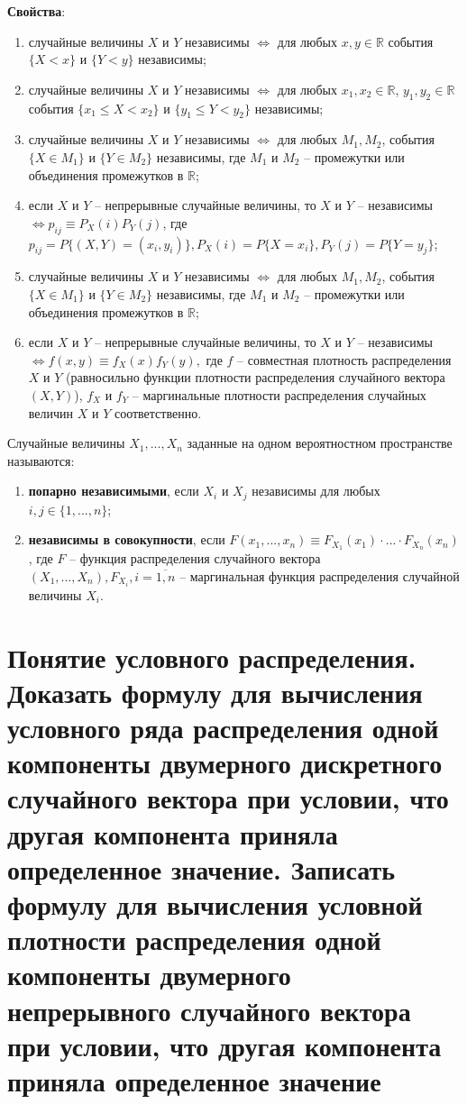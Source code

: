 \textbf{Свойства}:
\begin{enumerate}
	\item случайные величины $X$ и $Y$ независимы $\iff$ для любых $x, y \in \mathbb{R}$ события $\{X < x\}$ и $\{Y < y\}$ независимы;
	\item случайные величины $X$ и $Y$ независимы $\iff$ для любых $x_1, x_2 \in \mathbb{R}$, $y_1, y_2 \in \mathbb{R}$ события $\{x_1 \leq X < x_2\}$ и $\{y_1 \leq Y < y_2\}$ независимы;
	\item случайные величины $X$ и $Y$ независимы $\iff$ для любых $M_1, M_2$, события $\{X \in M_1\}$ и $\{Y \in M_2\}$ независимы, где $M_1$ и $M_2$ -- промежутки или объединения промежутков в $\mathbb{R}$;
	\item если $X$ и $Y$ -- непрерывные случайные величины, то $X$ и $Y$ -- независимы $\iff p_{ij} \equiv P_X(i)P_Y(j)$, где $p_{ij} = P\{(X, Y) = (x_i, y_i)\}, P_X(i) = P\{X = x_i\}, P_Y(j) = P\{Y = y_j\}$;
	\item случайные величины $X$ и $Y$ независимы $\iff$ для любых $M_1, M_2$, события $\{X \in M_1\}$ и $\{Y \in M_2\}$ независимы, где $M_1$ и $M_2$ -- промежутки или объединения промежутков в $\mathbb{R}$;
	\item если $X$ и $Y$ -- непрерывные случайные величины, то $X$ и $Y$ -- независимы $\iff f(x, y) \equiv f_X(x)f_Y(y),$ где $f$ -- совместная плотность распределения $X$ и $Y$ (равносильно функции плотности распределения случайного вектора $(X, Y)$), $f_X$ и $f_Y$ -- маргинальные плотности распределения случайных величин $X$ и $Y$ соответственно.
\end{enumerate}

Случайные величины $X_1, ..., X_n$ заданные на одном вероятностном пространстве называются:
\begin{enumerate}
	\item \textbf{попарно независимыми}, если $X_i$ и $X_j$ независимы для любых $i, j \in \{1, ..., n\}$;
	\item \textbf{независимы в совокупности}, если $F(x_1, ..., x_n) \equiv F_{X_1}(x_1) \cdot ... \cdot F_{X_n}(x_n)$, где $F$ -- функция распределения случайного вектора $(X_1, ..., X_n), F_{X_i},  i = \overline{1, n}$ -- маргинальная функция распределения случайной величины $X_i$.
\end{enumerate}

\section{Понятие условного распределения. Доказать формулу для вычисления условного ряда распределения одной компоненты двумерного дискретного случайного вектора при условии, что другая компонента приняла определенное значение. Записать формулу для вычисления условной плотности распределения одной компоненты двумерного непрерывного случайного вектора при условии, что другая компонента приняла определенное значение}

